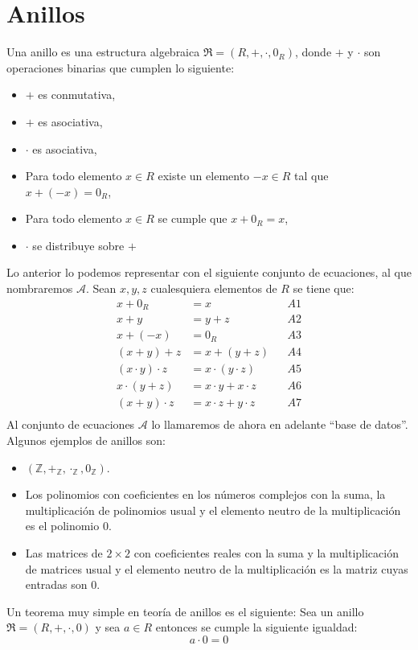 \documentclass[a4paper]{article}
\begin{document}
\section{Anillos}
\noindent
Una anillo es una estructura algebraica \(\mathfrak{R} = (R, +, \cdot, 0_{R})\),
donde \(+\) y \(\cdot\) son operaciones binarias que cumplen lo siguiente:
\begin{itemize}
    \item \(+\) es conmutativa,
    \item \(+\) es asociativa,
    \item \(\cdot\) es asociativa,
    \item Para todo elemento \(x \in R\) existe un elemento \(-x \in R\) tal que 
    \(x + (-x) = 0_{R}\),
    \item Para todo elemento \(x \in R\) se cumple que \(x + 0_{R} = x\),
    \item \(\cdot\) se distribuye sobre \(+\)
\end{itemize}
Lo anterior lo podemos representar con el siguiente conjunto de ecuaciones, al que
nombraremos \(\mathcal{A}\).
\newline 
Sean \(x, y, z\) cualesquiera elementos de \(R\) se tiene que:
\begin{align*}
    x + 0_{R} &= x & &A1 \\
    x + y &= y + z & &A2 \\
    x + (-x) &= 0_{R} & &A3 \\
    (x + y) + z &= x + (y + z) & &A4 \\
    (x \cdot y) \cdot z &= x \cdot (y \cdot z) & &A5 \\
    x \cdot (y + z) &= x \cdot y + x \cdot z & &A6 \\
    (x + y) \cdot z &= x \cdot z + y \cdot z & &A7 \\
\end{align*}
Al conjunto de ecuaciones \(\mathcal{A}\) lo llamaremos de ahora en adelante
``base de datos''.
\newline
Algunos ejemplos de anillos son:
\begin{itemize}
    \item \((\mathbb{Z}, +_{\mathbb{Z}}, \cdot_{\mathbb{Z}}, 0_{\mathbb{Z}})\).
    \item Los polinomios con coeficientes en los números complejos con la suma,
    la multiplicación de polinomios usual y el elemento neutro de la multiplicación
    es el polinomio \(0\).
    \item Las matrices de \(2 \times 2\) con coeficientes reales con la suma y 
    la multiplicación de matrices usual y el elemento neutro de la multiplicación
    es la matriz cuyas entradas son \(0\).
\end{itemize}
Un teorema muy simple en teoría de anillos es el siguiente:
\newline
Sea un anillo \(\mathfrak{R} = (R, +, \cdot, 0)\) y sea \(a \in R\) entonces se cumple 
la siguiente igualdad:
\newline 
\[
    a \cdot 0 = 0
\]
\end{document}
